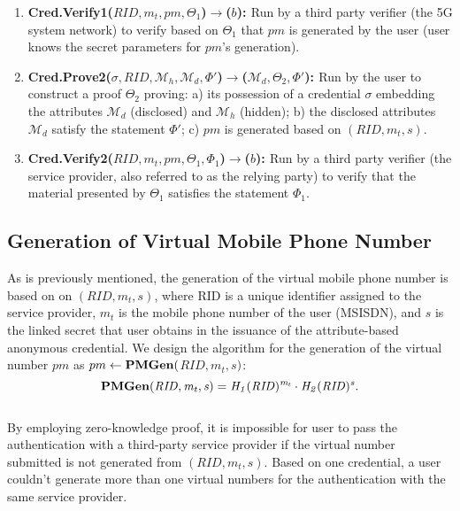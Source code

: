 \begin{enumerate}
    \item{\bf{Cred.Verify1($RID, m_t, pm, \Theta_1$)$\rightarrow$($b$): }}Run by a third party verifier (the 5G system network) to verify based on $\Theta_1$ that $pm$ is generated by the user (user knows the secret parameters for $pm$'s generation).\\
    
    \item{\bf{Cred.Prove2($\sigma, RID, \mathcal{M}_h, \mathcal{M}_d, \Phi'$)$\rightarrow$($\mathcal{M}_d, \Theta_2, \Phi'$): }}Run by the user to construct a proof $\Theta_2$ proving: a) its possession of a credential $\sigma$ embedding the attributes $\mathcal{M}_d$ (disclosed) and $\mathcal{M}_h$ (hidden); b) the disclosed attributes $\mathcal{M}_d$ satisfy the statement $\Phi'$; c) $pm$ is generated based on $(RID, m_t, s)$.\\
    
    \item{\bf{Cred.Verify2($RID, m_t, pm, \Theta_1, \Phi_1$)$\rightarrow$($b$): }}Run by a third party verifier (the service provider, also referred to as the relying party) to verify that the material presented by $\Theta_1$ satisfies the statement $\Phi_1$.

\end{enumerate}
\subsection{Generation of Virtual Mobile Phone Number}
As is previously mentioned, the generation of the virtual mobile phone number is based on on $(RID, m_t, s)$, where RID is a unique identifier assigned to the service provider, $m_t$ is the mobile phone number of the user (MSISDN), and $s$ is the linked secret that user obtains in the issuance of the attribute-based anonymous credential. We design the algorithm for the generation of the virtual number $pm$ as 
$pm\leftarrow \bf{PMGen(}$$RID, m_t, s$$\bf{)}$:
$$\bf{PMGen(}\mathit{RID, m_t, s}\bf{)}=\mathit{H_1(RID)^{m_t}}\cdot\mathit{H_2(RID)^{s}}.$$\\
By employing zero-knowledge proof, it is impossible for user to pass the authentication with a third-party service provider if the virtual number submitted is not generated from $(RID, m_t, s)$. Based on one credential, a user couldn't generate more than one virtual numbers for the authentication with the same service provider.

